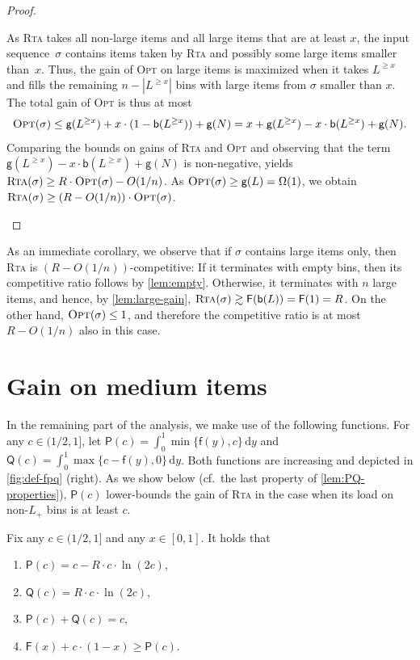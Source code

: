 \documentclass[a4paper,USenglish,cleveref]{lipics-v2019}
\newcommand{\R}{\ensuremath{R}}
\newcommand{\LG}{\ensuremath{L}\xspace}
\newcommand{\LT}{\ensuremath{L_+}\xspace}
\newcommand{\f}{\textsf{f}}
\newcommand{\fintegral}{\textsf{F}}
\newcommand{\water}{\textsf{Q}}
\newcommand{\cutintegral}{\textsf{P}}
\newcommand{\B}{\textsf{b}}
\newcommand{\gain}{\textsf{g}}
\newcommand{\dd}{\mathrm{d}}
\newcommand{\ALG}{\textsc{Rta}\xspace}
\newcommand{\OPT}{\textsc{Opt}\xspace}
\begin{document}
\begin{proof}
\begin{itemize}
As \ALG takes all non-large items and all large items that are at least $x$, the
input sequence~$\sigma$ contains items taken by \ALG and possibly some large
items smaller than~$x$. Thus, the gain of \OPT on large items is maximized when
it takes $\LG^{\geq x}$ and fills the remaining $n - |L^{\geq x}|$ bins with
large items from $\sigma$ smaller than $x$. The total gain of \OPT
is thus at most 
\[
  \OPT(\sigma) \leq \gain(L^{\geq x}) + x \cdot (1-\B(\LG^{\geq x})) + \gain(N) 
  = x + \gain(L^{\geq x}) - x \cdot \B(\LG^{\geq x}) + \gain(N).
\]
Comparing the bounds on gains of \ALG and \OPT and observing that 
the term $\gain(L^{\geq x}) - x \cdot \B(\LG^{\geq x}) + \gain(N)$
is non-negative, yields $\ALG(\sigma) \geq \R \cdot \OPT(\sigma) - O(1/n)$. 
As $\OPT(\sigma) \geq \gain(\LG) = \Omega(1)$, we obtain
$\ALG(\sigma) \geq (\R - O(1/n)) \cdot \OPT(\sigma)$.
\qedhere
\end{itemize}
\end{proof}

As an immediate corollary, we observe that if $\sigma$ contains large
items only, then \ALG is $(R - O(1/n))$-competitive: If it terminates with empty
bins, then its competitive ratio follows by \cref{lem:empty}. Otherwise, it
terminates with $n$ large items, and hence, by \cref{lem:large-gain}, $\ALG(\sigma) \gtrsim
\fintegral(\B(\LG)) = \fintegral(1) = \R$. On the other hand, $\OPT(\sigma) \leq 1$, and
therefore the competitive ratio is at most $R - O(1/n)$ also in this case.




\section{Gain on medium items}
\label{sec:medium}


In the remaining part of the analysis, we make use of the following functions.
For any $c \in (1/2, 1]$, let $\cutintegral(c) = \int_0^1 \min \{ \f(y), c \}\,
\dd y$ and $\water(c) = \int_0^1 \max \{ c - \f(y), 0 \}\, \dd y$. Both
functions are increasing and depicted in \cref{fig:def-fpq} (right).
As we show below (cf.~the last property of \cref{lem:PQ-properties}),
$\cutintegral(c)$ lower-bounds the gain of \ALG in the case when
its load on non-\LT bins is at least $c$.

\begin{lemma}
\label{lem:PQ-properties}
Fix any $c \in (1/2, 1]$ and any $x \in [0,1]$. It holds that 
\begin{enumerate}
\item $\cutintegral(c) = c - \R \cdot c \cdot \ln (2 c)$,
\item $\water(c) = \R \cdot c \cdot \ln(2 c)$, 
\item $\cutintegral(c) + \water(c) = c$,
\item $\fintegral(x) + c \cdot (1 - x) \geq \cutintegral(c)$.
\end{enumerate}
\end{lemma}
\end{document}
